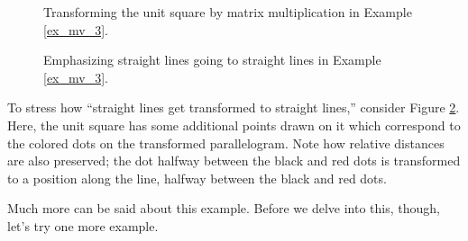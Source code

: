{\begin{figure}[h!]
\begin{center}
\begin{tikzpicture}[x={(.75cm,0)},y={(0,.75cm)}, >=latex]
\end{tikzpicture}
\end{center}
\caption{Transforming the unit square by matrix multiplication in Example \ref{ex_mv_3}.}
\label{fig:mv_3}
\end{figure}

\begin{figure}[h!]
\begin{center}
\end{center}
\caption{Emphasizing straight lines going to straight lines in Example \ref{ex_mv_3}.}
\label{fig:mv_3b}
\end{figure}

To stress how ``straight lines get transformed to straight lines,'' consider Figure \ref{fig:mv_3b}. Here, the unit square has some additional points drawn on it which correspond to the colored dots on the transformed parallelogram. Note how relative distances are also preserved; the dot halfway between the black and red dots is transformed to a position along the line, halfway between the black and red dots.
} %


Much more can be said about this example. Before we delve into this, though, let's try one more example.\\

